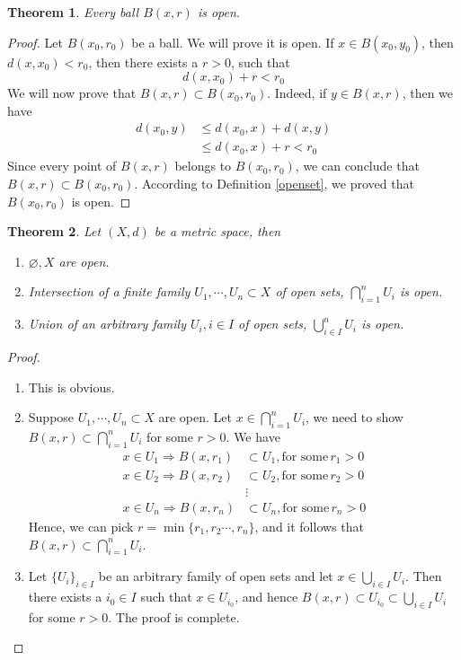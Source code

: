 \documentclass[12pt,leqno]{amsart}
\newtheorem{theorem}{Theorem}[section]
\theoremstyle{definition}
\numberwithin{equation}{subsection}
\begin{document}
\medskip

\begin{theorem}
Every ball $B(x,r)$ is open.
\end{theorem}
\begin{proof}
Let $B(x_0,r_0)$ be a ball. We will prove it is open. If $x\in B(x_0, y_0)$, then $d(x, x_0)<r_0$, then there exists a $r>0$, such that $$d(x,x_0)+r < r_0$$
We will now prove that $B(x,r)\subset B(x_0,r_0)$. Indeed, if $y\in B(x,r)$, then we have 
\begin{align*}
    d(x_0,y) & \leq d(x_0,x) + d(x,y) \\
    & \leq d(x_0,x) + r < r_0
\end{align*}
Since every point of $B(x,r)$ belongs to $B(x_0,r_0)$, we can conclude that $B(x,r)\subset B(x_0,r_0)$. According to Definition \ref{openset}, we proved that $B(x_0,r_0)$ is open.
\end{proof}

\medskip

\begin{theorem}
Let $(X,d)$ be a metric space, then
\begin{enumerate}
    \item $\varnothing, X$ are open.
    \item Intersection of a finite family $U_1, \cdots, U_n \subset X$ of open sets, $\bigcap^n_{i=1}U_i$ is open.
    \item Union of an arbitrary family $U_i,i\in I$ of open sets, $\bigcup^n_{i\in I}U_i$ is open.
\end{enumerate}
\end{theorem}
\begin{proof}
~\begin{enumerate}
    \item This is obvious.
    \item Suppose $U_1, \cdots, U_n \subset X$ are open. Let $x\in \bigcap^n_{i=1}U_i$, we need to show $B(x,r)\subset \bigcap^n_{i=1}U_i$ for some $r>0$. We have 
    \begin{align*}
        x\in U_1 \Rightarrow B(x,r_1) & \subset U_1, \text{for some} \, r_1 > 0 \\
        x\in U_2 \Rightarrow B(x,r_2) & \subset U_2, \text{for some} \, r_2 > 0 \\
        & \vdots \\
        x\in U_n \Rightarrow B(x,r_n) & \subset U_n, \text{for some} \, r_n > 0
    \end{align*}
    Hence, we can pick $r = \min\{r_1, r_2\cdots,r_n\}$, and it follows that $B(x,r) \subset \bigcap^n_{i=1}U_i$.
    \item Let $\{U_i\}_{i\in I}$ be an arbitrary family of open sets and let $x\in \bigcup_{i\in I}U_i$. Then there exists a $i_0\in I$ such that $x\in U_{i_0}$, and hence $B(x,r) \subset U_{i_0} \subset \bigcup_{i\in I}U_i$ for some $r>0$. The proof is complete.
\end{enumerate}
\end{proof}
\end{document}
